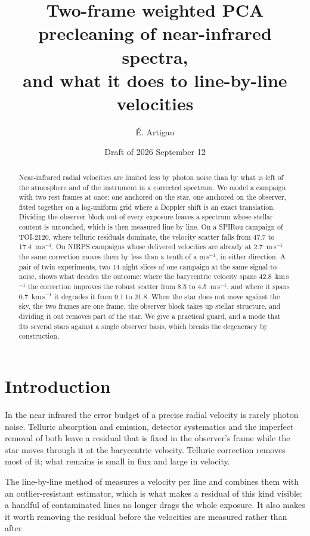 \documentclass[11pt]{article}
\title{Two-frame weighted PCA precleaning of near-infrared spectra,\\
and what it does to line-by-line velocities}
\author{É. Artigau}
\date{Draft of 2026 September 12}
\begin{document}
\maketitle

\begin{abstract}
Near-infrared radial velocities are limited less by photon noise than by what
is left of the atmosphere and of the instrument in a corrected spectrum. We
model a campaign with two rest frames at once: one anchored on the star, one
anchored on the observer, fitted together on a log-uniform grid where a Doppler
shift is an exact translation. Dividing the observer block out of every
exposure leaves a spectrum whose stellar content is untouched, which is then
measured line by line. On a SPIRou campaign of TOI-2120, where telluric
residuals dominate, the velocity scatter falls from 47.7 to 17.4~m\,s$^{-1}$.
On NIRPS campaigns whose delivered velocities are already at 2.7~m\,s$^{-1}$ the
same correction moves them by less than a tenth of a m\,s$^{-1}$, in either
direction. A pair of twin experiments, two 14-night slices
of one campaign at the same signal-to-noise, shows what decides the outcome:
where the barycentric velocity spans 42.8~km\,s$^{-1}$ the correction improves
the robust scatter from 8.5 to 4.5~m\,s$^{-1}$, and where it spans
0.7~km\,s$^{-1}$ it degrades it from 9.1 to 21.8. When the star does not move
against the sky, the two frames are one frame, the observer block takes up
stellar structure, and dividing it out removes part of the star. We give a
practical guard, and a mode that fits several stars against a single observer
basis, which breaks the degeneracy by construction.
\end{abstract}

\section{Introduction}

In the near infrared the error budget of a precise radial velocity is rarely
photon noise. Telluric absorption and emission, detector systematics and the
imperfect removal of both leave a residual that is fixed in the observer's
frame while the star moves through it at the barycentric velocity. Telluric
correction removes most of it; what remains is small in flux and large in
velocity.

The line-by-line method of \citet{artigau2022} measures a velocity per line and
combines them with an outlier-resistant estimator, which is what makes a
residual of this kind visible: a handful of contaminated lines no longer drags
the whole exposure. It also makes it worth removing the residual before the
velocities are measured rather than after.
\end{document}

